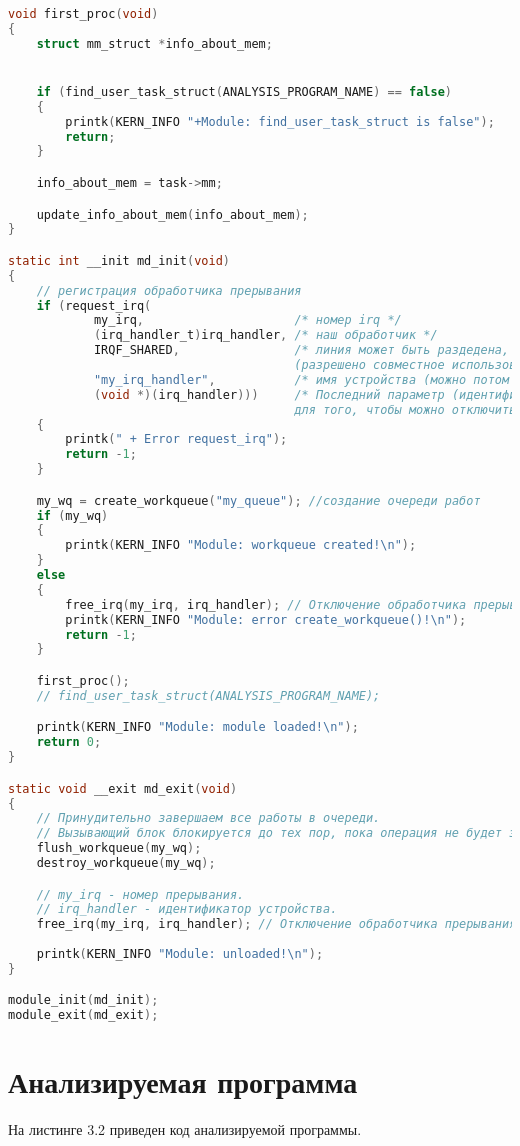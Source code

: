 \begin{lstlisting}[language=c, label=some-code, caption=Загружаемый модуль ядра]
void first_proc(void)
{
	struct mm_struct *info_about_mem; 


	if (find_user_task_struct(ANALYSIS_PROGRAM_NAME) == false)
	{
		printk(KERN_INFO "+Module: find_user_task_struct is false");
		return;
	}

	info_about_mem = task->mm;

	update_info_about_mem(info_about_mem);
}

static int __init md_init(void)
{
	// регистрация обработчика прерывания
	if (request_irq(
			my_irq,						/* номер irq */
			(irq_handler_t)irq_handler, /* наш обработчик */
			IRQF_SHARED,				/* линия может быть раздедена, IRQ
										(разрешено совместное использование)*/
			"my_irq_handler",			/* имя устройства (можно потом посмотреть в /proc/interrupts)*/
			(void *)(irq_handler)))		/* Последний параметр (идентификатор устройства) irq_handler нужен
										для того, чтобы можно отключить с помощью free_irq  */
	{
		printk(" + Error request_irq");
		return -1;
	}

	my_wq = create_workqueue("my_queue"); //создание очереди работ
	if (my_wq)
	{
		printk(KERN_INFO "Module: workqueue created!\n");
	}
	else
	{
		free_irq(my_irq, irq_handler); // Отключение обработчика прерывания.
		printk(KERN_INFO "Module: error create_workqueue()!\n");
		return -1;
	}

	first_proc();
	// find_user_task_struct(ANALYSIS_PROGRAM_NAME);

	printk(KERN_INFO "Module: module loaded!\n");
	return 0;
}

static void __exit md_exit(void)
{
	// Принудительно завершаем все работы в очереди.
	// Вызывающий блок блокируется до тех пор, пока операция не будет завершена.
	flush_workqueue(my_wq);
	destroy_workqueue(my_wq);

	// my_irq - номер прерывания.
	// irq_handler - идентификатор устройства.
	free_irq(my_irq, irq_handler); // Отключение обработчика прерывания.
	
	printk(KERN_INFO "Module: unloaded!\n");
}

module_init(md_init);
module_exit(md_exit);
\end{lstlisting}

\section{Анализируемая программа}

На листинге 3.2 приведен код анализируемой программы. 

